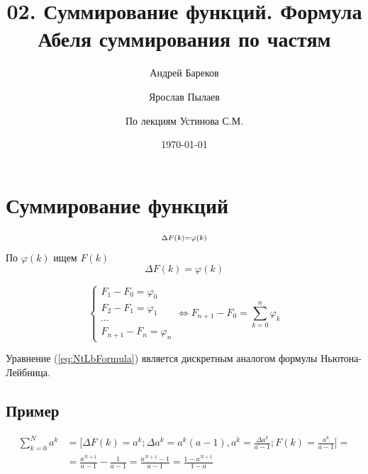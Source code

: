 \documentclass[a4paper,11pt]{article}
\title{02. Суммирование функций. Формула Абеля суммирования по частям}
\author{Андрей Бареков \and Ярослав Пылаев \and По лекциям Устинова С.М.}
\date{\today}
\begin{document}
\maketitle
\newpage

\section{Суммирование функций}
\marginpar
{
  \begin{gather*}
    \begin{subarray}{1}
      \Delta F(k)= \varphi (k) \\
    \end{subarray}
  \end{gather*}
  \footnotesize По $\varphi (k)$ ищем $F(k)$
}
\begin{equation}
  \Delta F(k) = \varphi(k)
\end{equation}

\begin{equation}
  \begin{cases}
    F_1 - F_0 = \varphi_0 \\
    F_2 - F_1 = \varphi_1 \\
    \cdots \\
    F_{n+1} - F_n = \varphi_n
  \end{cases} \Leftrightarrow F_{n+1} - F_0 = \sum_{k=0}^{n} \varphi_k
  \label{eq:NtLbFormula}
\end{equation}

Уравнение (\ref{eq:NtLbFormula}) является дискретным аналогом формулы Ньютона-Лейбница.
\subsection{Пример}
\begin{equation*}
  \begin{split}
    \sum_{k=0}^{N} a^k & = \bigg[ \Delta F(k) = a^k; \Delta a^k = a^k(a-1), a^k = \frac{\Delta a^k}{a-1}; F(k) = \frac{a^k}{a-1} \bigg] = \\
    & = \frac{a^{N+1}}{a-1} - \frac{1}{a-1} = \frac{a^{N+1}-1}{a-1} = \frac{1-a^{N+1}}{1-a}
  \end{split}
\end{equation*}
\end{document}
